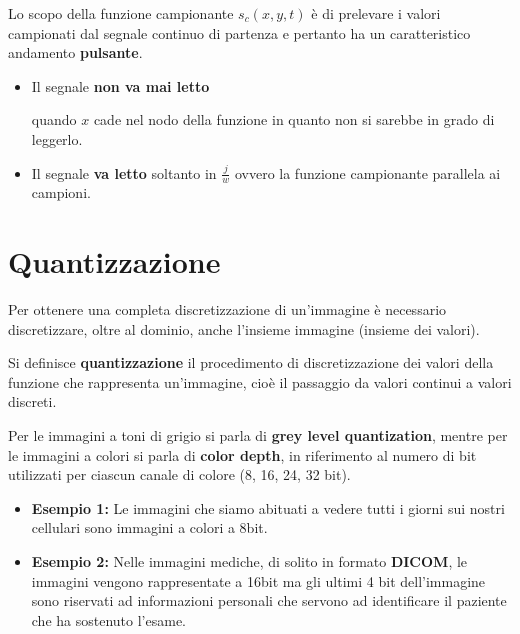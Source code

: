 Lo scopo della funzione campionante $s_c(x , y, t)$ è di prelevare i valori
campionati dal segnale continuo di partenza e pertanto ha un caratteristico
andamento \textbf{pulsante}.
\begin{itemize}
    \item Il segnale \textbf{non va mai letto}

          quando $x$ cade nel nodo della funzione in quanto non si sarebbe in
          grado di leggerlo.
    \item Il segnale \textbf{va letto}
          soltanto in $\frac{j}{w}$ ovvero la funzione campionante parallela ai
          campioni.
\end{itemize}


\section{Quantizzazione}
Per ottenere una completa discretizzazione di un'immagine è necessario
discretizzare, oltre al dominio, anche l'insieme immagine (insieme dei valori).
\begin{definition}
    Si definisce \textbf{quantizzazione} il procedimento di discretizzazione dei
    valori della funzione che rappresenta un'immagine, cioè il passaggio da
    valori continui a valori discreti.
\end{definition}
Per le immagini a toni di grigio si parla di \textbf{grey level quantization},
mentre per le immagini a colori si parla di \textbf{color depth}, in riferimento
al numero di bit utilizzati per ciascun canale di colore (8, 16, 24, 32 bit).
\begin{itemize}
    \item \textbf{Esempio 1:} 
          Le immagini che siamo abituati a vedere tutti i giorni sui nostri cellulari
          sono immagini a colori a 8bit.
    \item \textbf{Esempio 2:} Nelle immagini mediche, di solito in formato
          \textbf{DICOM}, le immagini vengono rappresentate a 16bit ma gli
          ultimi 4 bit dell'immagine sono riservati ad informazioni personali
          che servono ad identificare il paziente che ha sostenuto l'esame.
\end{itemize}
